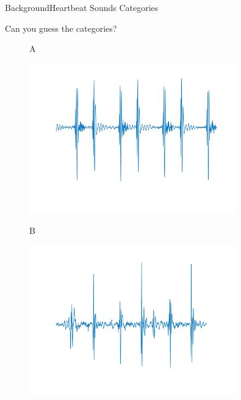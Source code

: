 \documentclass[10pt]{beamer}
\begin{document}
\begin{frame}{Background}{Heartbeat Sounds Categories}

	\begin{block}{Can you guess the categories?}
		
	
         \vspace{-0.25cm}
		\begin{figure}
			A
			
			\includegraphics[width=0.8\textwidth,height=0.45\textheight]{AAUgraphics/question.png}
		
		\end{figure}
	
	   \vspace{-2.0cm}
		\begin{figure}
			B
			\vspace{-0.04cm}
		
			\includegraphics[width=0.8\textwidth,height=0.40\textheight]{AAUgraphics/question2.png}
		
		\end{figure}
	
     \end{block}

\end{frame}
\end{document}
